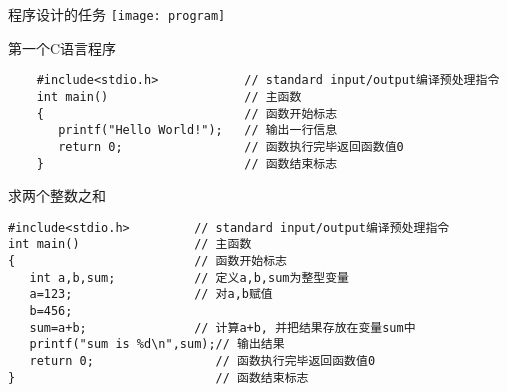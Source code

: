 \begin{frame}{程序设计的任务}
\centering
\texttt{[image: program]}
\end{frame}

\begin{frame}[fragile]{第一个C语言程序}
    \begin{lstlisting}
    #include<stdio.h>            // standard input/output编译预处理指令
    int main()                   // 主函数
    {                            // 函数开始标志
       printf("Hello World!");   // 输出一行信息
       return 0;                 // 函数执行完毕返回函数值0
    }                            // 函数结束标志
    \end{lstlisting}
\end{frame}

\begin{frame}[fragile]{求两个整数之和}
\begin{lstlisting}
#include<stdio.h>         // standard input/output编译预处理指令
int main()                // 主函数
{                         // 函数开始标志
   int a,b,sum;           // 定义a,b,sum为整型变量
   a=123;                 // 对a,b赋值
   b=456;
   sum=a+b;               // 计算a+b, 并把结果存放在变量sum中
   printf("sum is %d\n",sum);// 输出结果
   return 0;                 // 函数执行完毕返回函数值0
}                            // 函数结束标志
\end{lstlisting}
\end{frame}

